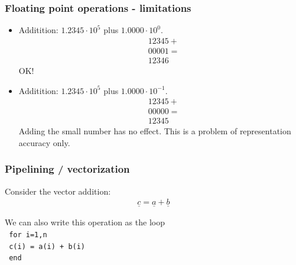 \documentclass{beamer}
\begin{document}
\begin{frame}\frametitle{Floating point operations - limitations}
  \begin{itemize}
    \item Additition: $1.2345\cdot 10^5$ plus $1.0000\cdot 10^0$.
        \[
          \begin{split}
            & 12345 + \\
            & 00001 = \\
            & 12346
          \end{split}
        \]
        OK!
      \item Additition: $1.2345\cdot 10^5$ plus $1.0000\cdot 10^{-1}$.
        \[
          \begin{split}
            & 12345 + \\
            & 00000 = \\
            & 12345
          \end{split}
        \]
        Adding the small number has no effect. This is a problem of representation accuracy only.
  \end{itemize}
\end{frame}

\begin{frame}\frametitle{Pipelining / vectorization}
Consider the vector addition: 
\begin{align*}
 \underline{c} = \underline{a} + \underline{b} 
 \end{align*}
\vspace{.5cm}

We can also write this operation as the loop\\
\vspace{.5cm}
\hspace{3cm}\texttt{   for i=1,n}           \\
\hspace{4cm}\texttt{          c(i) = a(i) + b(i)}\\
\hspace{3cm}\texttt{   end}
\end{frame}
\end{document}

